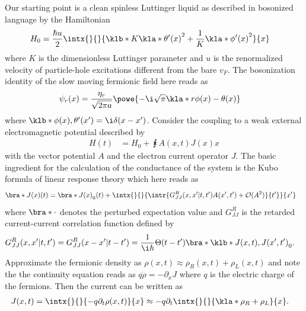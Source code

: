 \documentclass[english, parskip=full]{scrartcl}
\title{\titel}
\author{\autor}
\date{\today}
\begin{document}
\maketitle  %


Our starting point is a clean spinless Luttinger liquid as described in bosonized language by the Hamiltonian
\begin{align}
H_0 &= \frac{\hbar u}{2} \intx{ }{ }{\klb*{K\kla*{\theta'(x)}^2 + \frac{1}{K} \kla*{\phi'(x)}^2}}{x}
\end{align}
where $K$ is the dimensionless Luttinger parameter and $u$ is the renormalized velocity of particle-hole excitations different from the bare $v_F$.
The bosonization identity of the slow moving fermionic field here reads as 
\begin{align}
\psi_r(x) &= \frac{\eta_r}{\sqrt{2\pi a}} \powe{-\i \sqrt{\pi} \kla*{r\phi(x) - \theta(x)}}
\end{align}
where $\klb*{\phi(x), \theta'(x')} = \i\delta(x-x')$. 
Consider the coupling to a weak external electromagnetic potential described by
\begin{align}
H(t) &= H_0 + \intx{ }{ }{A(x,t)J(x)}{x}
\end{align}
with the vector potential $A$ and the electron current operator $J$.
The basic ingredient for the calculation of the conductance of the system is the Kubo formula of linear response theory which here reads as
\begin{align}
\bra*{J(x)}(t) &= \bra*{J(x)}_0(t) + \intx{ }{ }{\intr{G_{JJ}^R(x,x'|t,t') A(x',t') + \mathcal{O}(A^2)}{t'}}{x'}
\end{align}
where $\bra*{\cdot}$ denotes the perturbed expectation value and $G_{JJ}^R$ is the retarded current-current correlation function defined by
\begin{align}
G_{JJ}^R(x,x'|t,t') &= G_{JJ}^R(x-x'|t-t') = \frac{1}{\i\hbar} \Theta(t-t') \bra*{\klb*{J(x,t), J(x',t')} }_0.
\end{align}
Approximate the fermionic density as $\rho(x,t) \approx\rho_R(x,t) + \rho_L(x,t)$ and note the the continuity equation reads as $q\dot{\rho} = - \partial_xJ$ where $q$ is the electric charge of the fermions.
Then the current can be written as
\begin{align}
J(x,t) &= \intx{ }{ }{-q\partial_t \rho(x,t)}{x} \approx -q\partial_t \intx{ }{ }{\kla*{\rho_R + \rho_L}}{x}.
\end{align}
\end{document}
